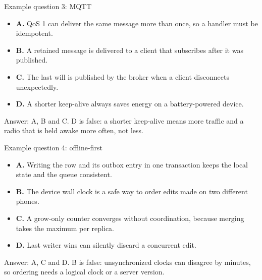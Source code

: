 \documentclass[10pt,aspectratio=169,t]{beamer}
\begin{document}
\begin{frame}[eyebrow=Exam]{Example question 3: MQTT}
  \vskip 1mm
  \vskip 2mm
  \begin{itemize}
    \item \textbf{A.} QoS 1 can deliver the same message more than once, so a handler must be idempotent.
    \item \textbf{B.} A retained message is delivered to a client that subscribes after it was published.
    \item \textbf{C.} The last will is published by the broker when a client disconnects unexpectedly.
    \item \textbf{D.} A shorter keep-alive always saves energy on a battery-powered device.
  \end{itemize}
  \begin{takeaway}{Answer: A, B and C.}
    D is false: a shorter keep-alive means more traffic and a radio that is held awake more often, not less.
  \end{takeaway}
\end{frame}

\begin{frame}[eyebrow=Exam]{Example question 4: offline-first}
  \vskip 1mm
  \vskip 2mm
  \begin{itemize}
    \item \textbf{A.} Writing the row and its outbox entry in one transaction keeps the local state and the queue consistent.
    \item \textbf{B.} The device wall clock is a safe way to order edits made on two different phones.
    \item \textbf{C.} A grow-only counter converges without coordination, because merging takes the maximum per replica.
    \item \textbf{D.} Last writer wins can silently discard a concurrent edit.
  \end{itemize}
  \begin{takeaway}{Answer: A, C and D.}
    B is false: unsynchronized clocks can disagree by minutes, so ordering needs a logical clock or a server version.
  \end{takeaway}
\end{frame}
\end{document}
